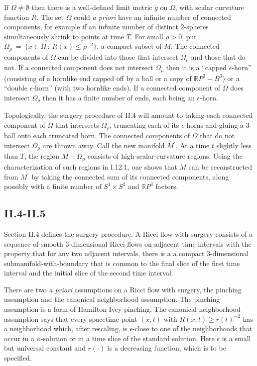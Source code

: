 \documentclass[12pt]{amsart}
\newcommand{\R}{{\mathbb R}}
\numberwithin{equation}{section}
\theoremstyle{plain}
\theoremstyle{definition}
\theoremstyle{remark}
\begin{document}
If $\Omega \neq \emptyset$ then there is a well-defined limit
metric $\overline{g}$ on $\Omega$, with scalar curvature
function $\overline{R}$. The set $\Omega$
could {\it a priori} have an infinite number of connected components,
for example if an infinite number of distinct $2$-spheres simultaneously
shrink to points at time $T$. For small $\rho > 0$,
put $\Omega_\rho \: = \: \{x \in \Omega \: : \: \overline{R}(x) \le \rho^{-2} \}$,
a compact subset of $M$.
The connected components of $\Omega$ can be divided into those
that intersect $\Omega_\rho$ and those that do not.  If a connected
component does not intersect $\Omega_\rho$ then it is a
``capped $\epsilon$-horn'' (consisting of a hornlike end capped off by a ball
or a copy of $\R P^3 - B^3$) or a ``double $\epsilon$-horn'' (with two
hornlike ends). If a connected component of $\Omega$ does intersect
$\Omega_\rho$ then it has a finite number of ends, each being
an $\epsilon$-horn. 

Topologically, the surgery procedure of II.4 will amount to taking each
connected component of $\Omega$ that intersects $\Omega_\rho$,
truncating each of its $\epsilon$-horns and gluing a $3$-ball onto
each truncated horn. 
The connected components of $\Omega$ that do not intersect
$\Omega_\rho$ are thrown away.
Call the new manifold $M^\prime$. At a time
$t$ slightly less than $T$, the region $M - \Omega_\rho$ consists
of high-scalar-curvature regions. Using the characterization of such
regions in I.12.1, one shows that $M$ can be reconstructed from
$M^\prime$ by taking the connected sum of its connected components,
along possibly with a finite number of $S^1 \times S^2$ and
$\R P^3$ factors.

\subsection{II.4-II.5}

Section II.4 defines the surgery procedure. 
A Ricci flow with surgery consists of a sequence of smooth $3$-dimensional Ricci flows on
adjacent time intervals with the property that for any two adjacent intervals, there is a
a compact $3$-dimensional submanifold-with-boundary that is common to the
final slice of the first time interval and the initial slice of the second time interval.

There are two {\it a priori} assumptions on a Ricci flow with surgery, the
pinching assumption and the
canonical neighborhood assumption.
The pinching assumption is a form of Hamilton-Ivey pinching. The canonical
neighborhood assumption says that every spacetime
point $(x,t)$ with $R(x,t) \ge r(t)^{-2}$ has a neighborhood which,
after rescaling, is $\epsilon$-close to one of the neighborhoods that occur
in a $\kappa$-solution or in a time slice of the standard solution. Here 
$\epsilon$ is a small but universal constant and $r(\cdot)$ is a decreasing
function, which is to be specified.
\end{document}
